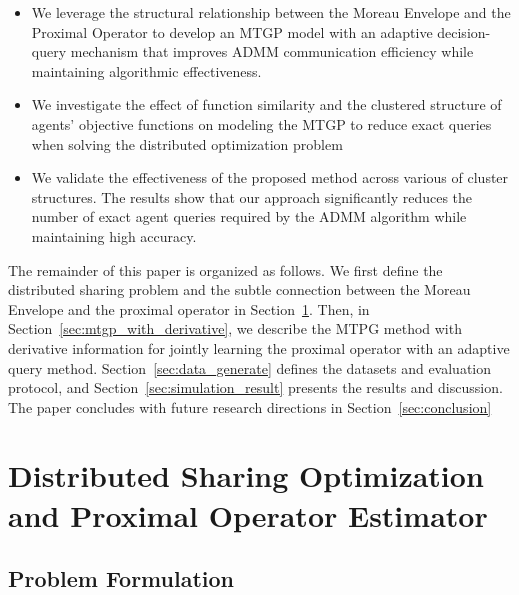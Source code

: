 \documentclass[conference]{IEEEtran}
\begin{document}
\begin{itemize}
    \item We leverage the structural relationship between the Moreau Envelope and the Proximal Operator to develop an MTGP model with an adaptive decision-query mechanism that improves ADMM communication efficiency while maintaining algorithmic effectiveness.

    \item We investigate the effect of function similarity and the clustered structure of agents' objective functions on modeling the MTGP to reduce exact queries when solving the distributed optimization problem
    
    \item We validate the effectiveness of the proposed method across various of cluster structures. The results show that our approach significantly reduces the number of exact agent queries required by the ADMM algorithm while maintaining high accuracy.
\end{itemize}

The remainder of this paper is organized as follows. We first define the distributed sharing problem and the subtle connection between the Moreau Envelope and the proximal operator in Section~\ref{sec:problem_formulation}. Then, in Section~\ref{sec:mtgp_with_derivative}, we describe the MTPG method 
with derivative information for jointly learning the proximal operator with an adaptive query method. 
Section~\ref{sec:data_generate} defines the datasets and evaluation protocol, and Section~\ref{sec:simulation_result} presents the results and discussion. The paper concludes with future research directions in Section~\ref{sec:conclusion}

\section{Distributed Sharing Optimization and Proximal Operator Estimator}
\label{sec:problem_formulation}

\subsection{Problem Formulation}
\end{document}
